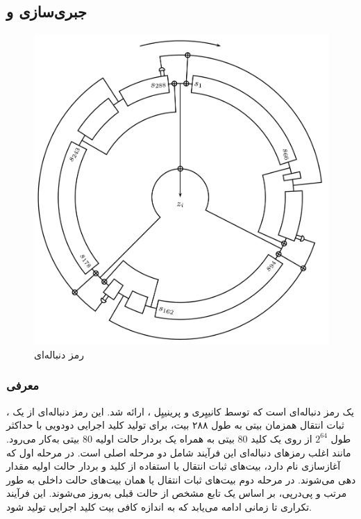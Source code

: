 \subsection{جبری‌سازی   و }
\begin{figure}
	\centering
	\includegraphics[width=0.6\linewidth]{Images/Trivium}
	\caption{  رمز دنباله‌ای 
		}
	\label{fig:trivium}
\end{figure}
\subsubsection*{معرفی }
، 
یک رمز دنباله‌ای است که  توسط  کانییِری 
و پرینییِل  
، 
\cite{canniere2005trivium}
ارائه شد. این رمز دنباله‌ای از یک ثبات انتقال همزمان بیتی به طول ۲۸۸ بیت، برای تولید کلید اجرایی دودویی با حداکثر طول 
$2^{64}$ 
از روی یک کلید 
$80$
بیتی به همراه  یک بردار حالت اولیه 
$80$
بیتی به‌کار می‌رود. مانند اغلب رمزهای دنباله‌ای این فرآیند شامل دو مرحله اصلی است. در مرحله اول که آغازسازی نام‌ دارد، بیت‌های ثبات انتقال  با استفاده از کلید و بردار حالت اولیه مقدار دهی می‌شوند.  در مرحله دوم بیت‌های ثبات انتقال یا همان بیت‌های حالت داخلی  به طور مرتب و پی‌درپی، بر اساس یک تابع  مشخص  از حالت قبلی  به‌روز می‌شوند. این فرآیند تکراری تا زمانی ادامه می‌یابد که به اندازه کافی بیت کلید اجرایی تولید شود. 

